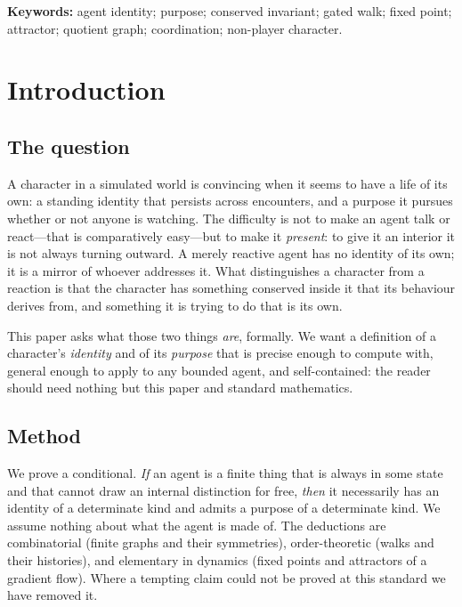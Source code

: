 \documentclass[11pt,twocolumn,a4paper]{article}
\begin{document}
\vspace{0.5em}
\noindent\textbf{Keywords:} agent identity; purpose; conserved invariant;
gated walk; fixed point; attractor; quotient graph; coordination;
non-player character.

\section{Introduction}
\label{sec:intro}

\subsection{The question}

A character in a simulated world is convincing when it seems to have a
life of its own: a standing identity that persists across encounters, and
a purpose it pursues whether or not anyone is watching. The difficulty is
not to make an agent talk or react---that is comparatively easy---but to
make it \emph{present}: to give it an interior it is not always turning
outward. A merely reactive agent has no identity of its own; it is a
mirror of whoever addresses it. What distinguishes a character from a
reaction is that the character has something conserved inside it that its
behaviour derives from, and something it is trying to do that is its own.

This paper asks what those two things \emph{are}, formally. We want a
definition of a character's \emph{identity} and of its \emph{purpose}
that is precise enough to compute with, general enough to apply to any
bounded agent, and self-contained: the reader should need nothing but
this paper and standard mathematics.

\subsection{Method}

We prove a conditional. \emph{If} an agent is a finite thing that is
always in some state and that cannot draw an internal distinction for
free, \emph{then} it necessarily has an identity of a determinate kind
and admits a purpose of a determinate kind. We assume nothing about what
the agent is made of. The deductions are combinatorial (finite graphs and
their symmetries), order-theoretic (walks and their histories), and
elementary in dynamics (fixed points and attractors of a gradient flow).
Where a tempting claim could not be proved at this standard we have
removed it.
\end{document}
